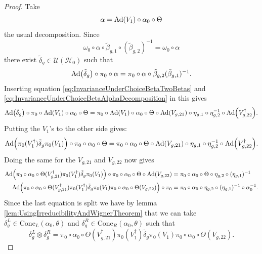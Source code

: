 \documentclass[12pt,a4paper,twoside]{article}
\let\originalleft\left
\let\originalright\right
\renewcommand{\left}{\mathopen{}\mathclose\bgroup\originalleft}
\renewcommand{\right}{\aftergroup\egroup\originalright}
\newcommand{\UU}{\mathcal U}
\newcommand{\HH}{\mathcal H}
\newcommand{\Ad}[1]{\textrm{Ad}\left(#1\right)}
\theoremstyle{definition}
\numberwithin{equation}{section}
\begin{document}
\begin{proof}
	Take 
	\begin{equation}\label{eq:InvarianceUnderChoiceBetaAlphaDecomposition}
		\alpha=\Ad{V_1}\circ\alpha_{0}\circ\Theta
	\end{equation}
	the usual decomposition. Since
	\begin{equation}
		\omega_0\circ\alpha\circ\tilde{\beta}_{g,1}\circ(\tilde{\beta}_{g,2})^{-1}=\omega_0\circ\alpha
	\end{equation}
	there exist $\tilde{\delta}_g\in\UU(\HH_0)$ such that
	\begin{equation}
		\Ad{\tilde{\delta}_g}\circ\pi_0\circ\alpha=\pi_0\circ\alpha\circ\tilde{\beta}_{g,2}(\tilde{\beta}_{g,1})^{-1}.
	\end{equation}
	Inserting equation \eqref{eq:InvarianceUnderChoiceBetaTwoBetas} and \eqref{eq:InvarianceUnderChoiceBetaAlphaDecomposition} in this gives
	\begin{equation}
		\Ad{\tilde{\delta}_g}\circ\pi_0\circ\Ad{V_1}\circ\alpha_0\circ\Theta=\pi_0\circ\Ad{V_1}\circ\alpha_0\circ\Theta\circ\Ad{V_{g,21}}\circ\eta_{g,1}\circ\eta_{g,2}^{-1}\circ\Ad{V_{g,22}^\dagger}.
	\end{equation}
	Putting the $V_1$'s to the other side gives:
	\begin{equation}
		\Ad{\pi_0(V_1^\dagger) \tilde{\delta}_g\pi_0(V_1)}\circ\pi_0\circ\alpha_0\circ\Theta=\pi_0\circ\alpha_0\circ\Theta\circ\Ad{V_{g,21}}\circ\eta_{g,1}\circ\eta_{g,2}^{-1}\circ\Ad{V_{g,22}^\dagger}.
	\end{equation}
	Doing the same for the $V_{g,21}$ and $V_{g,22}$ now gives
	\begin{align}
		\Ad{\pi_0\circ\alpha_0\circ\Theta(V_{g,21}^\dagger)\pi_0(V_1^\dagger)\tilde{\delta}_g\pi_0(V_1)}\circ\pi_0\circ\alpha_0\circ\Theta\circ\Ad{V_{g,22}}&=\pi_0\circ\alpha_0\circ\Theta\circ\eta_{g,2}\circ(\eta_{g,1})^{-1}\\
		\Ad{\pi_0\circ\alpha_0\circ\Theta(V_{g,21}^\dagger)\pi_0(V_1^\dagger)\tilde{\delta}_g\pi_0(V_1)\pi_0\circ\alpha_0\circ\Theta(V_{g,22})}\circ\pi_0&=\pi_0\circ\alpha_0\circ\eta_{g,2}\circ(\eta_{g,1})^{-1}\circ\alpha_0^{-1}.
	\end{align}
	Since the last equation is split we have by lemma \ref{lem:UsingIrreducibilityAndWignerTheorem} that we can take $\delta_g^L\in\textrm{Cone}_L(\alpha_0,\theta)$ and $\delta_g^R\in\textrm{Cone}_R(\alpha_0,\theta)$ such that
	\begin{equation}
		\delta_g^L\otimes\delta_g^R=\pi_0\circ\alpha_0\circ\Theta(V_{g,21}^\dagger)\pi_0(V_1^\dagger)\tilde{\delta}_g\pi_0(V_1)\pi_0\circ\alpha_0\circ\Theta(V_{g,22}).

\end{equation}
\end{proof}
\end{document}
